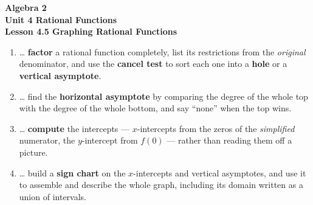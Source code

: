 \documentclass[10pt]{article}
\begin{document}
\vspace{-0.8in}

\begin{center}
  {\color{white}\textbf{\LARGE Algebra 2}}\\[4pt]
  {\color{forestmid}\large\textbf{Unit 4 \quad Rational Functions}}\\[6pt]
  {\color{white}\textbf{\large Lesson 4.5 \quad Graphing Rational Functions}}
\end{center}

\vspace{0.22in}
\namedateperiod
\vspace{0.18in}

\begin{learningtargetbox}
\small
\begin{enumerate}[leftmargin=1.5em, itemsep=5pt]
  \item \ldots{} \textbf{factor} a rational function completely, list its restrictions from the
        \emph{original} denominator, and use the \textbf{cancel test} to sort each one into a
        \textbf{hole} or a \textbf{vertical asymptote}.
  \item \ldots{} find the \textbf{horizontal asymptote} by comparing the degree of the whole top with
        the degree of the whole bottom, and say ``none'' when the top wins.
  \item \ldots{} \textbf{compute} the intercepts --- $x$-intercepts from the zeros of the
        \emph{simplified} numerator, the $y$-intercept from $f(0)$ --- rather than reading them off a
        picture.
  \item \ldots{} build a \textbf{sign chart} on the $x$-intercepts and vertical asymptotes, and use it
        to assemble and describe the whole graph, including its domain written as a union of
        intervals.
\end{enumerate}
\end{learningtargetbox}

\vspace{0.14in}
\end{document}
